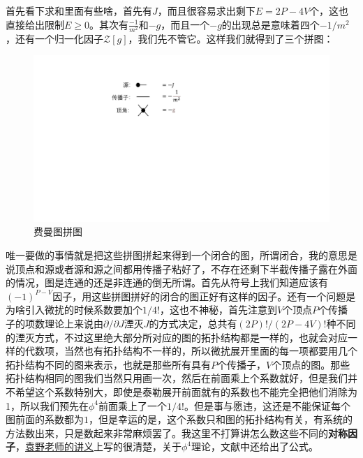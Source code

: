 首先看下求和里面有些啥，首先有$J$，而且很容易求出剩下$E=2P-4V$个，这也直接给出限制$E\geq 0$。其次有$\frac{-1}{m^2}$和$-g$，而且一个$-g$的出现总是意味着四个$-1/m^2$，还有一个归一化因子$\mathcal{Z}[g]$，我们先不管它。这样我们就得到了三个拼图：
\begin{figure}[H]
	\centering
	\includegraphics{figs/fig2.pdf}
	\caption{费曼图拼图}
\end{figure}

唯一要做的事情就是把这些拼图拼起来得到一个闭合的图，所谓闭合，我的意思是说顶点和源或者源和源之间都用传播子粘好了，不存在还剩下半截传播子露在外面的情况，图是连通的还是非连通的倒无所谓。首先从符号上我们知道应该有$(-1)^{P-V}$因子，用这些拼图拼好的闭合的图正好有这样的因子。还有一个问题是为啥引入微扰的时候系数要加个$1/4!$，这也不神秘，首先注意到$V$个顶点$P$个传播子的项数理论上来说由$\partial/\partial J$湮灭$J$的方式决定，总共有$(2P)!/(2P-4V)!$种不同的湮灭方式，不过这里绝大部分所对应的图的拓扑结构都是一样的，也就会对应一样的代数项，当然也有拓扑结构不一样的，所以微扰展开里面的每一项都要用几个拓扑结构不同的图来表示，也就是那些所有具有$P$个传播子，$V$个顶点的图。那些拓扑结构相同的图我们当然只用画一次，然后在前面乘上个系数就好，但是我们并不希望这个系数特别大，即使是泰勒展开前面就有的系数也不能完全把他们消除为1，所以我们预先在$\phi^4$前面乘上了一个$1/4!$。但是事与愿违，这还是不能保证每个图前面的系数都为$1$，但是幸运的是，这个系数只和图的拓扑结构有关，有系统的方法数出来，只是数起来非常麻烦罢了。我这里不打算讲怎么数这些不同的\textbf{对称因子}，\href{https://person.zju.edu.cn/yuan}{袁野老师的讲义}上写的很清楚，关于$\phi^4$理论，文献\cite{Palmer:2001vq}中还给出了公式。

